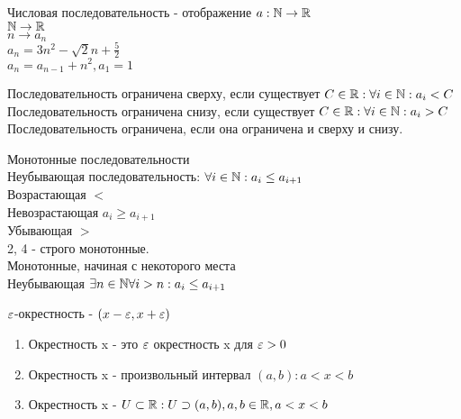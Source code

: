 


\begin{definition}
	Числовая последовательность - отображение $ a: \mathbb{N} \rightarrow \mathbb{R} $ \\
	$ \mathbb{N} \rightarrow \mathbb{R} $ \\
	$ n \rightarrow a_n $ \\
	$ a_n = 3n^2 - \sqrt{2} n+ \frac{5}{2} $ \\
	$ a_n = a_{n-1} + n^2, a_1 = 1$
\end{definition}

\begin{definition}
	Последовательность ограничена сверху, если существует  $ C \in \mathbb{R} : \forall i \in \mathbb{N} : a_i < C $  \\
	Последовательность ограничена снизу, если существует  $ C \in \mathbb{R} : \forall i \in \mathbb{N} : a_i > C $ \\
	Последовательность ограничена, если она ограничена и сверху и снизу.
\end{definition}

\begin{definition}
	Монотонные последовательности \\
	Неубывающая последовательность: $ \forall i \in \mathbb{N} : a_i \leq a_{i+1} $\\
	Возрастающая $ < $ \\
	Невозрастающая $ a_i \geq a_{i+1} $\\
	Убывающая $ > $ \\
	2, 4 - строго монотонные.\\
	Монотонные, начиная с некоторого места \\
	Неубывающая $ \exists n \in \mathbb{N} \forall i > n : a_i \leq a_{i+1} $\\
\end{definition}



\begin{definition}
	$ \varepsilon$-окрестность - $ (x - \varepsilon, x+\varepsilon) $
	\begin{enumerate}
		\item  Окрестность x - это $ \varepsilon $ окрестность x для $ \varepsilon > 0 $
		\item Окрестность x - произвольный интервал $ (a ,b) : a < x < b$
		\item Окрестность x - $U \subset \mathbb{R} :  U \supset (a, b) , a, b \in \mathbb{R}, a < x < b $ 
	\end{enumerate}
\end{definition}

